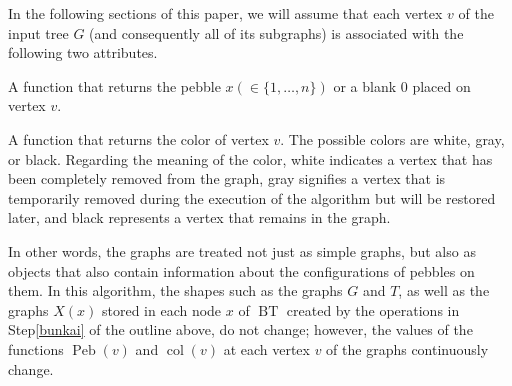 \documentclass[letter,11pt]{article}
\theoremstyle{definition}
\theoremstyle{definition}
\DeclareMathOperator{\BT}{BT}
\DeclareMathOperator{\Peb}{Peb}
\DeclareMathOperator{\col}{col}
\newcommand{\1}{\boldmath$~1~$\unboldmath}
\newcommand{\tume}{\hspace*{0.2em}}
\newcommand{\namelistlabel}[1]{\hspace*{10pt}\mbox{#1}:\hspace{\fill}}
\newenvironment{namelist}[1]{%
    \begin{list}{}
      {\let\makelabel\namelistlabel
      \settowidth{\labelwidth}{#1}
      \setlength{\leftmargin}{1.1\labelwidth}
      \setlength{\labelsep}{5pt}
      \setlength{\parsep}{0pt}}
  }{%
  \end{list}}
\begin{document}
In the following sections of this paper, we will assume that each vertex $v$ of the input tree $G$ (and consequently all of its subgraphs) is associated with the following two attributes.
\begin{namelist}{********}
\item[$\Peb(v)$]{A function that returns the pebble $x (\in \{1,\ldots,n\})$ or a blank $0$ placed on vertex $v$.}
\item[$\col(v)$]{A function that returns the color of vertex $v$. The possible colors are white, gray, or black.
Regarding the meaning of the color, white indicates a vertex that has been completely removed from the graph, gray signifies a vertex that is temporarily removed during the execution of the algorithm but will be restored later, and black represents a vertex that remains in the graph.
}
\end{namelist}
In other words, the graphs are treated not just as simple graphs, but also as objects that also contain information about the configurations of pebbles on them.
In this algorithm, the shapes such as the graphs $G$ and $T$, as well as the graphs $X(x)$ stored in each node $x$ of $\BT$ created by the operations in Step\tume\ref{bunkai} of the outline above, do not change; however, the values of the functions $\Peb(v)$ and $\col(v)$ at each vertex $v$ of the graphs continuously change.


\end{document}
